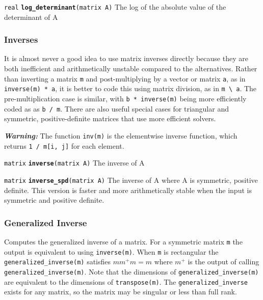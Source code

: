\documentclass[
  10pt,
]{book}
\begin{document}

\texttt{real} \textbf{\texttt{log\_determinant}}\texttt{(matrix\ A)}\newline
The log of the absolute value of the determinant of A

\hypertarget{inverses}{%
\subsubsection{Inverses}\label{inverses}}

It is almost never a good idea to use matrix inverses directly because
they are both inefficient and arithmetically unstable compared to the
alternatives. Rather than inverting a matrix \texttt{m} and post-multiplying
by a vector or matrix \texttt{a}, as in \texttt{inverse(m)\ *\ a}, it is better to
code this using matrix division, as in \texttt{m\ \textbackslash{}\ a}. The
pre-multiplication case is similar, with \texttt{b\ *\ inverse(m)} being more
efficiently coded as as \texttt{b\ /\ m}. There are also useful special cases
for triangular and symmetric, positive-definite matrices that use more
efficient solvers.

\emph{\textbf{Warning:}} The function \texttt{inv(m)} is the elementwise inverse
function, which returns \texttt{1\ /\ m{[}i,\ j{]}} for each element.


\texttt{matrix} \textbf{\texttt{inverse}}\texttt{(matrix\ A)}\newline
The inverse of A


\texttt{matrix} \textbf{\texttt{inverse\_spd}}\texttt{(matrix\ A)}\newline
The inverse of A where A is symmetric, positive definite. This version
is faster and more arithmetically stable when the input is symmetric
and positive definite.

\hypertarget{generalized-inverse}{%
\subsubsection{Generalized Inverse}\label{generalized-inverse}}

Computes the generalized inverse of a matrix. For a symmetric matrix \texttt{m}
the output is equivalent to using \texttt{inverse(m)}. When \texttt{m} is
rectangular the \texttt{generalized\_inverse(m)} satisfies \(m m^+ m = m\) where
\(m^+\) is the output of calling \texttt{generalized\_inverse(m)}. Note that the
dimensions of \texttt{generalized\_inverse(m)} are equivalent to the
dimensions of \texttt{transpose(m)}. The \texttt{generalized\_inverse} exists
for any matrix, so the matrix may be singular or less than full rank.
\end{document}

